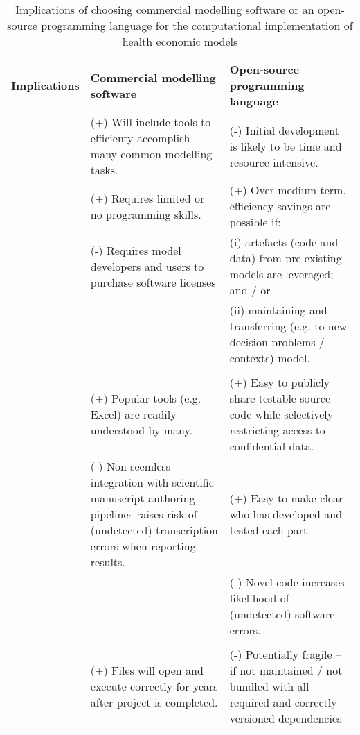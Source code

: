 \documentclass[sn-vancouver,Numbered,pdflatex]{sn-jnl}
\theoremstyle{remark}
\theoremstyle{definition}
\begin{document}
\begin{table}

\caption{\label{tab:proscons}Implications of choosing commercial modelling software or an open-source programming language for the computational implementation of health economic models}
\centering
\begin{tabular}[t]{>{\raggedright\arraybackslash}p{7em}>{\raggedright\arraybackslash}p{20em}>{\raggedright\arraybackslash}p{20em}}
\toprule
Implications & Commercial modelling software & Open-source programming language\\
\midrule
 & (+) Will include tools to efficienty accomplish many common modelling tasks. & (-) Initial development is likely to be time and resource intensive.\\

 & (+) Requires limited or no programming skills. & (+) Over medium term, efficiency savings are possible if:\\

 & (-) Requires model developers and users to purchase software licenses & (i)  artefacts (code and data) from pre-existing models are leveraged; and / or\\

\multirow{-4}{7em}{\raggedright\arraybackslash \textbf{Resources}} &  & (ii)    maintaining and transferring (e.g. to new decision problems / contexts) model.\\
\cmidrule{1-3}
\addlinespace[0.3em]
\multicolumn{3}{c}{\textbf{Transparency}}\\
\hspace{1em} & (+) Popular tools (e.g. Excel) are readily understood by many. & (+) Easy to publicly share testable source code while selectively restricting access to confidential data.\\

\hspace{1em} & (-) Non seemless integration with scientific manuscript authoring pipelines raises risk of (undetected) transcription errors when reporting results. & (+) Easy to make clear who has developed and tested each part.\\

\hspace{1em} &  & (-) Novel code increases likelihood of (undetected) software errors.\\

\addlinespace[0.3em]
\multicolumn{3}{c}{\textbf{Reusability}}\\
\hspace{1em} & (+) Files will open and execute correctly for years after project is completed. & (-) Potentially fragile – if not maintained / not bundled with all required and correctly versioned dependencies\\


\end{tabular}
\end{table}
\end{document}
